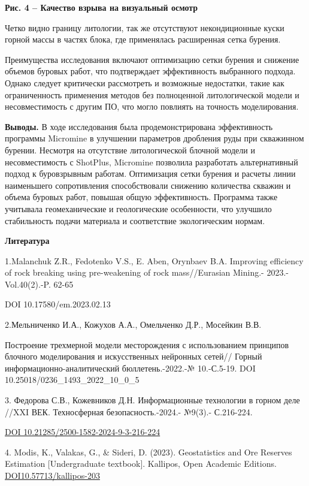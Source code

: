 {\bfseries Рис. 4 -- Качество взрыва на визуальный осмотр}

Четко видно границу литологии, так же отсутствуют некондиционные куски
горной массы в частях блока, где применялась расширенная сетка бурения.

Преимущества исследования включают оптимизацию сетки бурения и снижение
объемов буровых работ, что подтверждает эффективность выбранного
подхода. Однако следует критически рассмотреть и возможные недостатки,
такие как ограниченность применения методов без полноценной
литологической модели и несовместимость с другим ПО, что могло повлиять
на точность моделирования.

{\bfseries Выводы.} В ходе исследования была продемонстрирована
эффективность программы Micromine в улучшении параметров дробления руды
при скважинном бурении. Несмотря на отсутствие литологической блочной
модели и несовместимость с ShotPlus, Micromine позволила разработать
альтернативный подход к буровзрывным работам. Оптимизация сетки бурения
и расчеты линии наименьшего сопротивления способствовали снижению
количества скважин и объема буровых работ, повышая общую эффективность.
Программа также учитывала геомеханические и геологические особенности,
что улучшило стабильность подачи материала и соответствие экологическим
нормам.

{\bfseries Литература}

1.Malanchuk Z.R., Fedotenko V.S., E. Aben, Orynbaev B.A. Improving
efficiency of rock breaking using pre-weakening of rock mass//Eurasian
Mining.- 2023.-Vol.40(2).-P. 62-65

DOI 10.17580/em.2023.02.13

2.Мельниченко И.А., Кожухов А.А., Омельченко Д.Р., Мосейкин В.В.

Построение трехмерной модели месторождения с использованием принципов
блочного моделирования и искусственных нейронных сетей// Горный
информационно-аналитический бюллетень.-2022.-№ 10.-С.5-19. DOI
10.25018/0236\_1493\_2022\_10\_0\_5

3. Федорова С.В., Кожевников Д.Н. Информационные технологии в горном
деле //XXI ВЕК. Техносферная безопасность.-2024.- №9(3).- С.216-224.

\href{http://dx.doi.org/10.21285/2500-1582-2024-9-3-216-224}{DOI
10.21285/2500-1582-2024-9-3-216-224}

4. Modis, K., Valakas, G., \& Sideri, D. (2023). Geostatistics and Ore
Reserves Estimation {[}Undergraduate textbook{]}. Kallipos, Open
Academic Editions.
\href{http://dx.doi.org/10.57713/kallipos-203}{DOI10.57713/kallipos-203}

